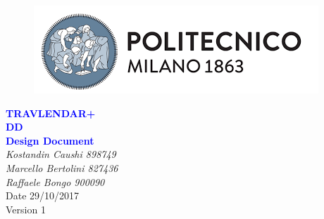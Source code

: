 


	\begin{titlepage}
		\centering
		\begin{figure}
			\vspace*{0mm}
			\centering
			\includegraphics[scale=0.7]{Images/Polimi_Logo}
			\\[3cm]
		\end{figure}		
		\vspace{65mm}
		\textcolor{Blue}{\textbf{\Huge TRAVLENDAR+}}\\[15mm]
		\textcolor{Blue}{\textbf{\huge DD}}\\[4mm]
		{\textcolor{Blue}{\textbf{\Large{Design Document}}}}\\
		\vspace{30mm}
		\textit{\large Kostandin Caushi 898749}\\[3mm]
		\textit{\large Marcello Bertolini 827436}\\[3mm]
		\textit{\large Raffaele Bongo 900090}\\[3mm]
		\vspace{30mm}
		Date 29/10/2017\\
		\vspace{10mm}
		Version 1
	\end{titlepage}

	\begin{center}
	\vspace*{-5mm}
	\renewcommand{\contentsname}{Table of Contents}
	\tableofcontents
	\newpage
	\listoffigures
	\newpage
    \end{center}
	
	\ttfamily
	\setlength{\emergencystretch}{45pt}

